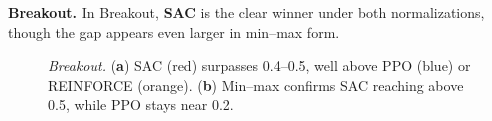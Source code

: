 \noindent \textbf{Breakout.} In Breakout, \textbf{SAC} is the clear winner under both normalizations, though the gap appears even larger in min--max form.
\begin{figure} 
	\centering
	\quad
	\caption{\emph{Breakout.}
		(\textbf{a}) SAC (red) surpasses 0.4--0.5, well above PPO (blue) or REINFORCE (orange).
		(\textbf{b}) Min--max confirms SAC reaching above 0.5, while PPO stays near 0.2.}
	\label{fig:breakout_combined}
\end{figure}

\medskip

